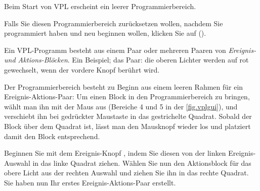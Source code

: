 \newpage





Beim Start von VPL erscheint ein leerer Programmierbereich.

Falls Sie diesen Programmierbereich zurücksetzen wollen, nachdem Sie programmiert haben und neu beginnen wollen, klicken Sie auf  ().

Ein VPL-Programm besteht aus einem Paar oder mehreren Paaren von \emph{Ereignis-
	und Aktions-Blöcken}. Ein Beispiel; das Paar:  die oberen Lichter werden auf rot gewechselt, wenn der vordere Knopf berührt wird. 


Der Programmierbereich besteht zu Beginn aus einem leeren Rahmen für ein Ereignis-Aktions-Paar:  Um einen Block in den Programmierbereich zu bringen, wählt man ihn mit der Maus aus (Bereiche 4 und 5 in der \cref{fig.vplgui}), und verschiebt ihn bei gedrückter Maustaste in das gestrichelte Quadrat. Sobald der Block über dem Quadrat ist, lässt man den Mausknopf wieder los und platziert damit den Block entsprechend.


Beginnen Sie mit dem Ereignis-Knopf , indem Sie diesen von der linken Ereignis-Auswahl in das linke Quadrat ziehen. Wählen Sie nun den Aktionsblock für das obere Licht  aus der rechten Auswahl und ziehen Sie ihn in das rechte Quadrat. Sie haben nun Ihr erstes Ereignis-Aktions-Paar erstellt.

